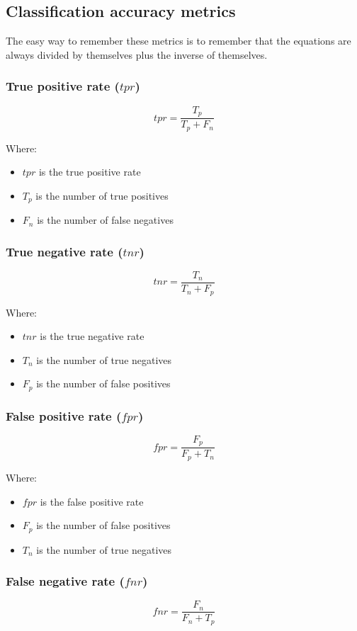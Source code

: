\documentclass[11pt]{article}
\begin{document}
\subsection{Classification accuracy metrics}
\label{sec:org526b9ad}
The easy way to remember these metrics is to remember that the equations are always divided by themselves plus the inverse of themselves.
\subsubsection{True positive rate (\(tpr\))}
\label{sec:orga3f8a90}
\[tpr = \frac{T_p}{T_p + F_n}\]

Where:
\begin{itemize}
\item \(tpr\) is the true positive rate
\item \(T_p\) is the number of true positives
\item \(F_n\) is the number of false negatives
\end{itemize}
\subsubsection{True negative rate (\(tnr\))}
\label{sec:org9632464}
\[tnr = \frac{T_n}{T_n + F_p}\]

Where:
\begin{itemize}
\item \(tnr\) is the true negative rate
\item \(T_n\) is the number of true negatives
\item \(F_p\) is the number of false positives
\end{itemize}
\subsubsection{False positive rate (\(fpr\))}
\label{sec:org0bd8a2a}
\[fpr = \frac{F_p}{F_p + T_n}\]

Where:
\begin{itemize}
\item \(fpr\) is the false positive rate
\item \(F_p\) is the number of false positives
\item \(T_n\) is the number of true negatives
\end{itemize}
\subsubsection{False negative rate (\(fnr\))}
\label{sec:orgd1f03c9}
\[fnr = \frac{F_n}{F_n + T_p}\]
\end{document}
